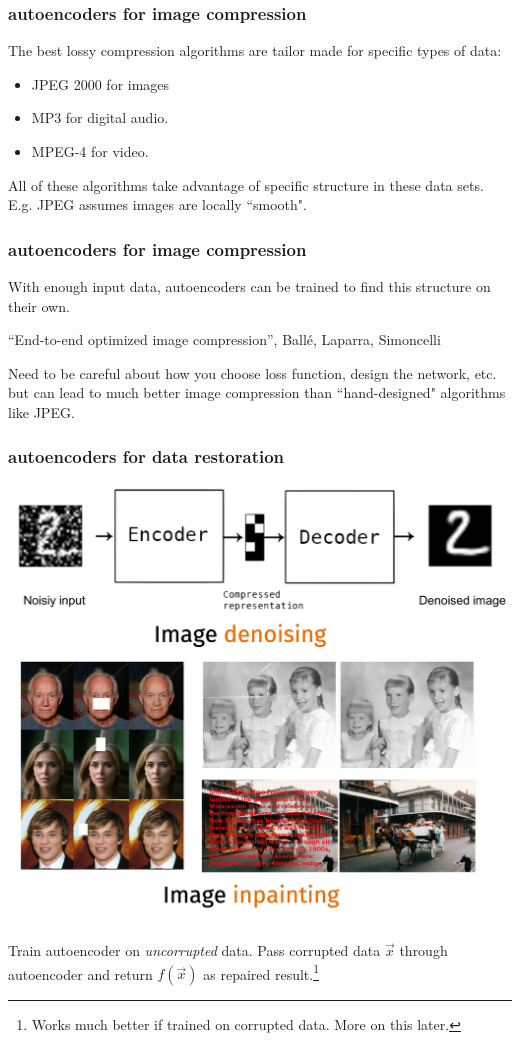 \documentclass[handout,compress]{beamer}
\begin{document}
\begin{frame}
	\frametitle{autoencoders for image compression}
	\small
	The best lossy compression algorithms are tailor made for specific types of data:\vspace{-.5em}
	\begin{itemize}
		\item JPEG 2000 for images
		\item MP3 for digital audio.
		\item MPEG-4 for video.
	\end{itemize}\vspace{-.5em}
	All of these algorithms take advantage of specific structure in these data sets. E.g. JPEG  assumes images are locally ``smooth".
	\begin{center}
	\end{center}
\end{frame}

\begin{frame}
	\frametitle{autoencoders for image compression}
	\small
	With enough input data, autoencoders can be trained to find this structure on their own.
	\begin{center}
		
		\tiny{``End-to-end optimized image compression'', Ball\'{e}, Laparra, Simoncelli}
	\end{center}
	 Need to be careful about how you choose loss function, design the network, etc. but can lead to much better image compression than ``hand-designed" algorithms like JPEG.
\end{frame}

\begin{frame}
	\frametitle{autoencoders for data restoration}
	\small
	\vspace{-1.5em}
	\begin{center}
		\includegraphics*[width=.6\textwidth]{resto.png}
	\end{center}
\vspace{-2em}
	Train autoencoder on \emph{uncorrupted} data. Pass corrupted data $\vec{x}$ through autoencoder and return $f(\vec{x})$ as repaired result.\footnote{Works much better if trained on corrupted data. More on this later.}
\end{frame}
\end{document}
